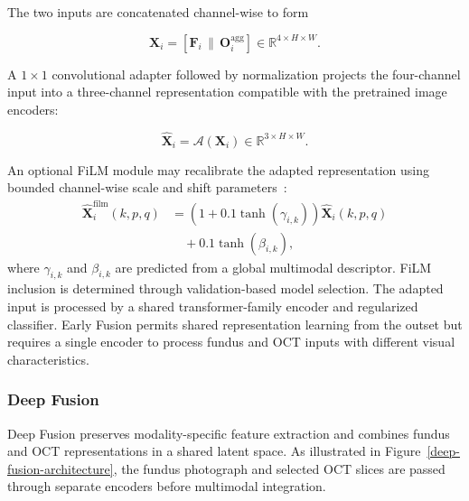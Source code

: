 \documentclass{ieeeaccess}
\begin{document}
The two inputs are concatenated channel-wise to form

\begin{equation}
    \mathbf{X}_{i}
    =
    \left[
    \mathbf{F}_{i}
    \,\|\,
    \mathbf{O}_{i}^{\mathrm{agg}}
    \right]
    \in\mathbb{R}^{4\times H\times W}.
    \label{eq:early_concat}
\end{equation}

A $1\times1$ convolutional adapter followed by normalization projects the four-channel input into a three-channel representation compatible with the pretrained image encoders:

\begin{equation}
    \hat{\mathbf{X}}_{i}
    =
    \mathcal{A}\!\left(\mathbf{X}_{i}\right)
    \in\mathbb{R}^{3\times H\times W}.
    \label{eq:early_adapter}
\end{equation}

An optional FiLM module may recalibrate the adapted representation using bounded channel-wise scale and shift parameters~\cite{perez2018film}:
\begin{equation}
    \begin{aligned}
        \hat{\mathbf{X}}_{i}^{\mathrm{film}}(k,p,q)
         & =
        \left(1+0.1\tanh(\gamma_{i,k})\right)\hat{\mathbf{X}}_{i}(k,p,q) \\
         & \quad +0.1\tanh(\beta_{i,k}),
    \end{aligned}
    \label{eq:early_film}
\end{equation}
where $\gamma_{i,k}$ and $\beta_{i,k}$ are predicted from a global multimodal descriptor. FiLM inclusion is determined through validation-based model selection. The adapted input is processed by a shared transformer-family encoder and regularized classifier. Early Fusion permits shared representation learning from the outset but requires a single encoder to process fundus and OCT inputs with different visual characteristics.

\subsubsection{Deep Fusion}
\label{subsubsec:deep_fusion}

Deep Fusion preserves modality-specific feature extraction and combines fundus and OCT representations in a shared latent space. As illustrated in Figure~\ref{deep-fusion-architecture}, the fundus photograph and selected OCT slices are passed through separate encoders before multimodal integration.
\end{document}
